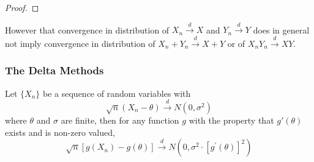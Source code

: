 \begin{proof}

\end{proof}

\begin{remark}
    However that convergence in distribution of $X_{n}\stackrel{d}{\rightarrow}X$ and $Y_{n}\stackrel{d}{\rightarrow}Y$ does in general not imply convergence in distribution of $X_n+Y_n\stackrel{d}{\rightarrow}X+Y$ or of $X_nY_n\stackrel{d}{\rightarrow}XY$.
\end{remark}

\subsubsection{The Delta Methods}

\begin{theorem}
    Let $\{X_{n}\}$ be a sequence of random variables with
    \begin{equation}
        \sqrt{n}\left(X_{n}-\theta\right)\stackrel{d}{\rightarrow}N\left(0,\sigma^{2}\right)
    \end{equation}
    where $\theta$ and $\sigma$ are finite, then for any function $g$ with the property that $g'(\theta)$ exists and is non-zero valued,
    \begin{equation}
        \sqrt{n}\left[g\left(X_{n}\right)-g(\theta)\right] \stackrel{d}{\rightarrow}N\left(0,\sigma^{2}\cdot\left[g^{\prime}(\theta)\right]^{2}\right)
    \end{equation}
\end{theorem}

